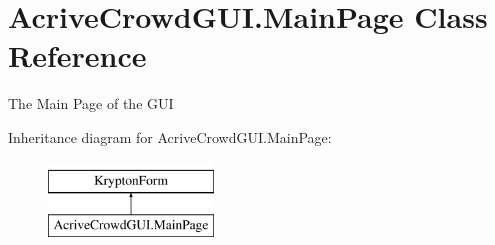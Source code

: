 \hypertarget{class_acrive_crowd_g_u_i_1_1_main_page}{}\section{Acrive\+Crowd\+G\+U\+I.\+Main\+Page Class Reference}
\label{class_acrive_crowd_g_u_i_1_1_main_page}


The Main Page of the G\+U\+I  


Inheritance diagram for Acrive\+Crowd\+G\+U\+I.\+Main\+Page\+:\begin{figure}[H]
\begin{center}
\leavevmode
\includegraphics[height=2.000000cm]{class_acrive_crowd_g_u_i_1_1_main_page}
\end{center}
\end{figure}
